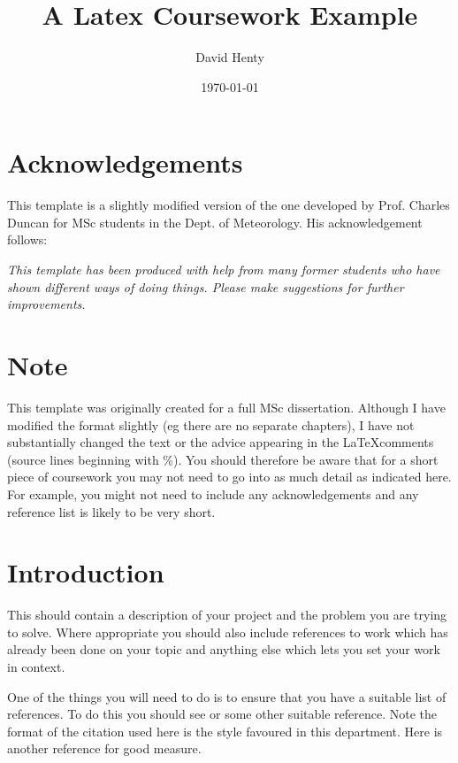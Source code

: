 \documentclass[12pt,a4paper]{article}
\begin{document}
\title{A Latex Coursework Example}
\author{David Henty}
\date{\today}

\makeEPCCtitle

\thispagestyle{empty}

\newpage


\tableofcontents

\newpage

\section*{Acknowledgements}

This template is a slightly modified version of the one developed by
Prof. Charles Duncan for MSc students in the Dept. of Meteorology. His
acknowledgement follows:

{\em This template has been produced with help from many former students who
have shown different ways of doing things. Please make suggestions for
further improvements.}

\section*{Note}

This template was originally created for a full MSc dissertation.
Although I have modified the format slightly (eg there are no separate
chapters), I have not substantially changed the text or the advice
appearing in the \LaTeX comments (source lines beginning with \%). You
should therefore be aware that for a short piece of coursework you may
not need to go into as much detail as indicated here. For example, you
might not need to include any acknowledgements and any reference list is
likely to be very short.



\newpage
{}

\section{Introduction}

This should contain a description of your project and the problem you
are trying to solve. Where appropriate you should also include
references to work which has already been done on your topic and
anything else which lets you set your work in context.

One of the things you will need to do is to ensure that you have a
suitable list of references.  To do this you should see \cite{ref:lam}
or some other suitable reference.  Note the format of the citation used
here is the style favoured in this department.  Here is another
reference \cite{ref:bloggs} for good measure.
\end{document}

